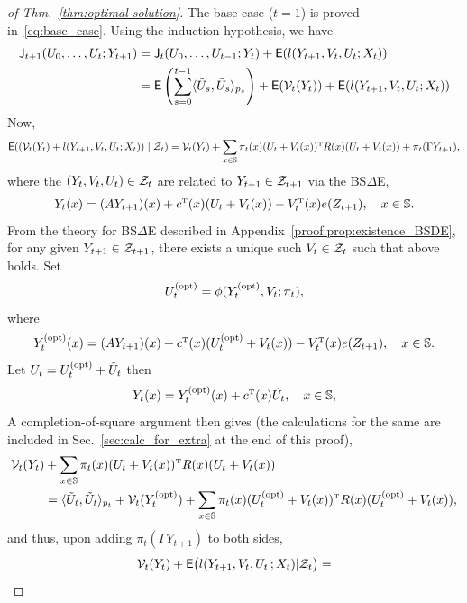 \documentclass[twoside,11pt]{article}
\def\Sec#1{Sec.~\ref{#1}}
\def\Sec#1{Sec.~\ref{#1}}
\def\clZ{{\cal Z}}
\def\Sec#1{Sec~\ref{#1}}
\def\E{{\sf E}}
\def\Sec#1{Sec.~\ref{#1}}
\def\clZ{{\cal Z}}
\def\bS{\begin{slide}}
\def\E{{\sf E}}
\def\Sec#1{Sec.~\ref{#1}}
\def\Thm#1{Thm.~\ref{#1}}
\def\clZ{{\cal Z}}
\def\clV{{\cal V}}
\def\clZ{{\cal Z}}
\def\E{{\sf E}}
\def\bS{\mathbb{S}}
\def\sJ{{\sf J}}
\def\tp{{\hbox{\rm\tiny T}}}
\def\opt{{\text{\rm (opt)}}}
\begin{document}
\begin{proof}[of  \Thm{thm:optimal-solution}]
The base case ($t=1$) is proved in~\eqref{eq:base_case}.  Using the
induction hypothesis, we have
\begin{align*}
\sJ_{t+1}(U_0,\hdots,U_{t};Y_{t+1}) &=
                                      \sJ_{t}(U_0,\hdots,U_{t-1};Y_{t}) + \E (l(Y_{t+1},V_t,U_t;X_t) )\\
  &= \E \left( \sum_{s=0}^{t-1}
 \langle \tilde{U}_s,\tilde{U}_s \rangle_{p_s} \right) + \E ( \clV_t(Y_t)) + \E (l(Y_{t+1},V_t,U_t;X_t) )
\end{align*}
Now,
\begin{equation*}
  \E ( \left(\clV_t(Y_t) + l(Y_{t+1},V_t,U_t;X_t) \right) \mid \clZ_t ) = \clV_t(Y_t)
  + \sum_{x\in\bS} \pi_t(x)
(U_t + V_t(x))^\tp R(x) (U_t + V_t(x)) +
  \pi_t(\Gamma Y_{t+1}) ,
\end{equation*}
where the $(Y_t,V_t,U_t)\in\clZ_t$ are related to $Y_{t+1}\in\clZ_{t+1}$ via
the BS$\Delta$E,
\begin{equation*}
Y_t(x) = (AY_{t+1})(x) + c^\tp(x) (U_t + V_t(x)) - V_t^\tp(x)e(Z_{t+1}),\quad x\in\bS.
\end{equation*}
From the theory for BS$\Delta$E described in
Appendix~\ref{proof:prop:existence_BSDE}, for any given $Y_{t+1}\in
\clZ_{t+1}$, there exists a unique such $V_t\in \clZ_t$ such that
above holds.  Set
\begin{equation*}
U_t^\opt = \phi(Y_t^\opt,V_t;\pi_t),
\end{equation*}
where
\begin{equation*}
Y_t^\opt(x) = (AY_{t+1})(x) + c^\tp(x) (U_t^\opt + V_t(x)) - V_t^\tp(x)e(Z_{t+1}),\quad x\in\bS.
\end{equation*}
Let $U_t = U_t^\opt + \tilde{U}_t$ then
\begin{equation*}
Y_t(x) = Y_t^\opt(x) + c^\tp(x) \tilde{U}_t ,\quad x\in\bS,
\end{equation*}
A completion-of-square argument then gives (the calculations for the
same are included in \Sec{sec:calc_for_extra} at the end of this proof),
\begin{align*}
\clV_t(Y_t) & + \sum_{x\in\bS} \pi_t(x)
(U_t + V_t(x))^\tp R(x) (U_t + V_t(x)) 
\\
& =  \langle \tilde{U}_t,\tilde{U}_t \rangle_{p_t}  +\clV_t(Y_t^\opt) + \sum_{x\in\bS} \pi_t(x)
(U_t^\opt + V_t(x))^\tp R(x) (U_t^\opt + V_t(x)),
\end{align*}
and thus, upon adding $\pi_t(\Gamma Y_{t+1})$ to both sides,
\begin{align*}
  \clV_t(Y_t) + \E \big( l (Y_{t+1},V_t,U_t\,;X_t)|\clZ_t\big) =

\end{align*}
\end{proof}
\end{document}
